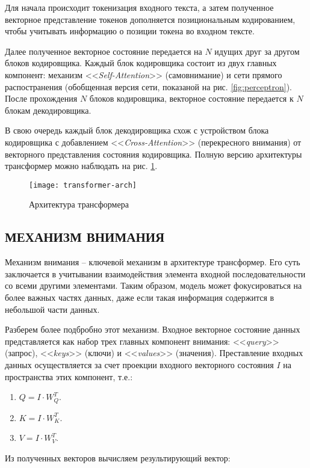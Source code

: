 Для начала происходит токенизация входного текста, а затем полученное векторное представление токенов дополняется позициональным кодированием, чтобы учитывать информацию о позиции токена во входном тексте.

Далее полученное векторное состояние передается на $N$ идущих друг за другом блоков кодировщика. Каждый блок кодировщика состоит из двух главных компонент: механизм <<\textit{Self-Attention}>> (самовнимание) и сети прямого распостранения (обобщенная версия сети, показаной на рис. \ref{fig:perceptron}). После прохождения $N$ блоков кодировщика, векторное состояние передается к $N$ блокам декодировщика.

В свою очередь каждый блок декодировщика схож с устройством блока кодировщика с добавлением <<\textit{Cross-Attention}>> (перекресного внимания) от векторного представления состояния кодировщика. Полную версию архитектуры трансформер можно наблюдать на рис. \ref{fig:transformer-arch}.
\begin{figure}[H]
    \centering
    \texttt{[image: transformer-arch]}
    \caption{Архитектура трансформера}
    \label{fig:transformer-arch}
\end{figure}
\subsection{МЕХАНИЗМ ВНИМАНИЯ}
Механизм внимания -- ключевой механизм в архитектуре трансформер. Его суть заключается в учитывании взаимодействия элемента входной последовательности со всеми другими элементами. Таким образом, модель может фокусироваться на более важных частях данных, даже если такая информация содержится в небольшой части данных.

Разберем более подбробно этот механизм. Входное векторное состояние данных представляется как набор трех главных компонент внимания: <<\textit{query}>> (запрос), <<\textit{keys}>> (ключи) и <<\textit{values}>> (значения). Преставление входных данных осуществляется за счет проекции входного векторного состояния $I$ на пространства этих компонент, т.е.:

\begin{enumerate}
    \item $Q = I \cdot W_Q^T$.
    \item $K = I \cdot W_K^T$.
    \item $V = I \cdot W_V^T$.
\end{enumerate}

Из полученных векторов вычисляем результирующий вектор:

